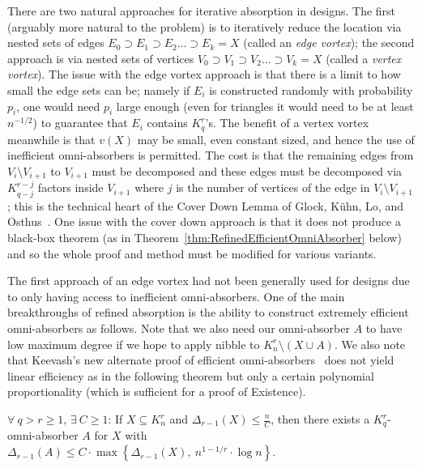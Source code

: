 \documentclass[twoside,leqno]{article}
\begin{document}
There are two natural approaches for iterative absorption in designs. The first (arguably more natural to the problem) is to iteratively reduce the location via nested sets of edges $E_0\supset E_1 \supset E_2 \ldots \supset E_k= X$ (called an \emph{edge vortex}); the second approach is via nested sets of vertices $V_0\supset V_1 \supset V_2\ldots \supset V_k =X$ (called a \emph{vertex vortex}). The issue with the edge vortex approach is that there is a limit to how small the edge sets can be; namely if $E_i$ is constructed randomly with probability $p_i$, one would need $p_i$ large enough (even for triangles it would need to be at least $n^{-1/2}$) to guarantee that $E_i$ contains $K_q^r$'s. The benefit of a vertex vortex meanwhile is that $v(X)$ may be small, even constant sized, and hence the use of inefficient omni-absorbers is permitted. The cost is that the remaining edges from $V_i\setminus V_{i+1}$ to $V_{i+1}$ must be decomposed and these edges must be decomposed via $K_{q-j}^{r-j}$ factors inside $V_{i+1}$ where $j$ is the number of vertices of the edge in $V_i\setminus V_{i+1}$; this is the technical heart of the Cover Down Lemma of Glock, K\"{u}hn, Lo, and Osthus~\cite{GKLO16}. One issue with the cover down approach is that it does not produce a black-box theorem (as in Theorem~\ref{thm:RefinedEfficientOmniAbsorber} below) and so the whole proof and method must be modified for various variants. 

The first approach of an edge vortex had not been generally used for designs due to only having access to inefficient omni-absorbers. One of the main breakthroughs of refined absorption is the ability to construct extremely efficient omni-absorbers as follows. Note that we also need our omni-absorber $A$ to have low maximum degree if we hope to apply nibble to $K_n^r\setminus (X\cup A)$. We also note that Keevash's new alternate proof of efficient omni-absorbers~\cite{K14} does not yield linear efficiency as in the following theorem but only a certain polynomial proportionality (which is sufficient for a proof of Existence). %

\begin{thm}\label{thm:EfficientOmniAbsorber}
$\forall~q > r \ge 1$, $\exists~C\ge 1$: If $X\subseteq  K_n^r$ and $\Delta_{r-1}(X) \le \frac{n}{C}$, then there exists a $K_q^r$-omni-absorber $A$ for $X$ with $\Delta_{r-1}(A) \le C\cdot \max\left\{\Delta_{r-1}(X),~n^{1-1/r}\cdot \log n\right\}$.    
\end{thm}
\end{document}
